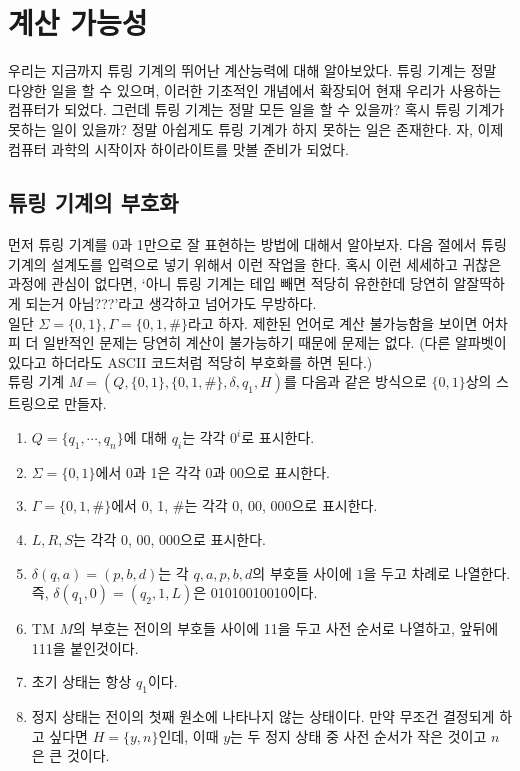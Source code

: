 \documentclass[b5paper]{book}
\theoremstyle{definition}
\begin{document}
\chapter{계산 가능성}
우리는 지금까지 튜링 기계의 뛰어난 계산능력에 대해 알아보았다. 튜링 기계는 정말 다양한 일을 할 수 있으며,
이러한 기초적인 개념에서 확장되어 현재 우리가 사용하는 컴퓨터가 되었다. 그런데 튜링 기계는 정말 모든 일을
할 수 있을까? 혹시 튜링 기계가 못하는 일이 있을까? 정말 아쉽게도 튜링 기계가 하지 못하는 일은 존재한다.
자, 이제 컴퓨터 과학의 시작이자 하이라이트를 맛볼 준비가 되었다.
\section{튜링 기계의 부호화}
먼저 튜링 기계를 0과 1만으로 잘 표현하는 방법에 대해서 알아보자. 다음 절에서 튜링 기계의 설계도를 
입력으로 넣기 위해서 이런 작업을 한다. 혹시 이런 세세하고 귀찮은 과정에 관심이 없다면, `아니 튜링 기계는
테입 빼면 적당히 유한한데 당연히 알잘딱하게 되는거 아님???'라고 생각하고 넘어가도 무방하다.\\ 
일단 $\Sigma = \{0, 1\}, \Gamma = \{0, 1, \#\}$라고 하자. 제한된 언어로 계산 불가능함을 보이면
어차피 더 일반적인 문제는 당연히 계산이 불가능하기 때문에 문제는 없다. (다른 알파벳이 있다고 하더라도 ASCII 코드처럼 
적당히 부호화를 하면 된다.) \\ 
튜링 기계 $M = (Q, \{0,1\}, \{0, 1, \#\}, \delta, q_1, H)$를 다음과 같은 방식으로
$\{0,1\}$상의 스트링으로 만들자.
\begin{enumerate}
    \item $Q = \{q_1, \cdots, q_n\}$에 대해 $q_i$는 각각 $0^i$로 표시한다. 
    \item $\Sigma = \{0,1\}$에서 0과 1은 각각 0과 00으로 표시한다. 
    \item $\Gamma = \{0,1,\#\}$에서 0, 1, \#는 각각 0, 00, 000으로 표시한다.
    \item $L, R, S$는 각각 0, 00, 000으로 표시한다.
    \item $\delta(q,a) = (p, b, d)$는 각 $q,a,p,b,d$의 부호들 사이에 $1$을 두고
    차례로 나열한다. 즉, $\delta(q_1, 0) = (q_2, 1, L)$은 01010010010이다. 
    \item TM $M$의 부호는 전이의 부호들 사이에 11을 두고 사전 순서로 나열하고, 
    앞뒤에 111을 붙인것이다. 
    \item 초기 상태는 항상 $q_1$이다. 
    \item 정지 상태는 전이의 첫째 원소에 나타나지 않는 상태이다. 만약 무조건
    결정되게 하고 싶다면 $H = \{y, n\}$인데, 이때 $y$는 두 정지 상태 중 
    사전 순서가 작은 것이고 $n$은 큰 것이다.
\end{enumerate}
\end{document}
